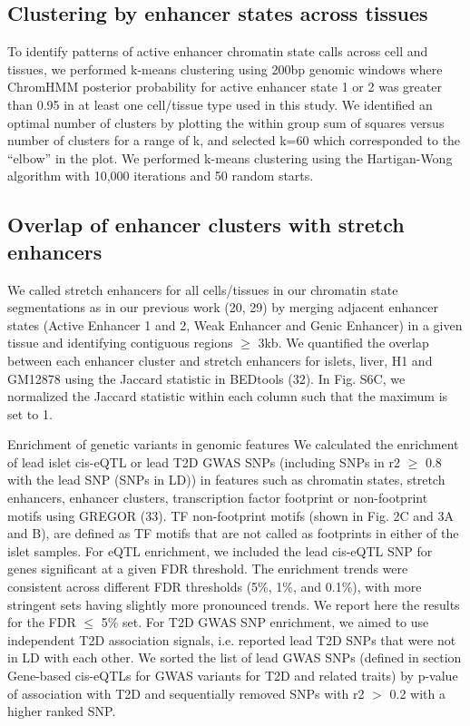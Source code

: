 \subsection{Clustering by enhancer states across tissues} 
To identify patterns of active enhancer chromatin state calls across cell and tissues, we performed k-means clustering using 200bp genomic windows where ChromHMM posterior probability for active enhancer state 1 or 2 was greater than 0.95 in at least one cell/tissue type used in this study. We identified an optimal number of clusters by plotting the within group sum of squares versus number of clusters for a range of k, and selected k=60 which corresponded to the “elbow” in the plot. We performed k-means clustering using the Hartigan-Wong algorithm with 10,000 iterations and 50 random starts.

\subsection{Overlap of enhancer clusters with stretch enhancers}
We called stretch enhancers for all cells/tissues in our chromatin state segmentations as in our previous work (20, 29) by merging adjacent enhancer states (Active Enhancer 1 and 2, Weak Enhancer and Genic Enhancer) in a given tissue and identifying contiguous regions $\geq$ 3kb. We quantified the overlap between each enhancer cluster and stretch enhancers for islets, liver, H1 and GM12878 using the Jaccard statistic in BEDtools (32). In Fig. S6C, we normalized the Jaccard statistic within each column such that the maximum is set to 1.

Enrichment of genetic variants in genomic features We calculated the enrichment of lead islet cis-eQTL or lead T2D GWAS SNPs (including SNPs in r2 $\geq$ 0.8 with the lead SNP (SNPs in LD)) in features such as chromatin states, stretch enhancers, enhancer clusters, transcription factor footprint or non-footprint motifs using GREGOR (33). TF non-footprint motifs (shown in Fig. 2C and 3A and B), are defined as TF motifs that are not called as footprints in either of the islet samples. For eQTL enrichment, we included the lead cis-eQTL SNP for genes significant at a given FDR threshold. The enrichment trends were consistent across different FDR thresholds (5\%, 1\%, and 0.1\%), with more stringent sets having slightly more pronounced trends. We report here the results for the FDR $\leq$ 5\% set. For T2D GWAS SNP enrichment, we aimed to use independent T2D association signals, i.e. reported lead T2D SNPs that were not in LD with each other. We sorted the list of lead GWAS SNPs (defined in section Gene-based cis-eQTLs for GWAS variants for T2D and related traits) by p-value of association with T2D and sequentially removed SNPs with r2 $>$ 0.2 with a higher ranked SNP. 

